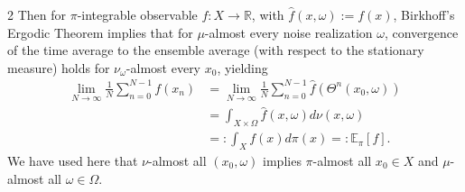 \documentclass[11pt]{article}
\begin{document}
\begin{multicols}{2}
Then for $\pi$-integrable observable $f:X\to\mathbb{R}$, with $\hat{f}(x,\omega):=f(x)$, Birkhoff's Ergodic Theorem implies that 
for $\mu$-almost every noise realization $\omega$, convergence of the time average to the ensemble average (with respect to the stationary measure) holds for $\nu_\omega$-almost every $x_0$, yielding
\begin{align}
\label{eq-time-space-avg-rds}
\lim_{N \to \infty} \frac{1}{N} \sum_{n=0}^{N-1} f(x_n) &= \lim_{N \to \infty} \frac{1}{N} \sum_{n=0}^{N-1} \hat{f}(\Theta^n(x_0,\omega)) \nonumber\\&= \int_{X\times\Omega} \hat{f}(x,\omega)
d\nu(x,\omega) \\
&=:
\int_X f(x)d\pi(x)=: \mathbb{E}_{\pi}[f].
\end{align}
We have used here that $\nu$-almost all $(x_0,\omega)$ implies $\pi$-almost all $x_0\in X$ and $\mu$-almost all $\omega\in\Omega$.







\end{multicols}
\end{document}

